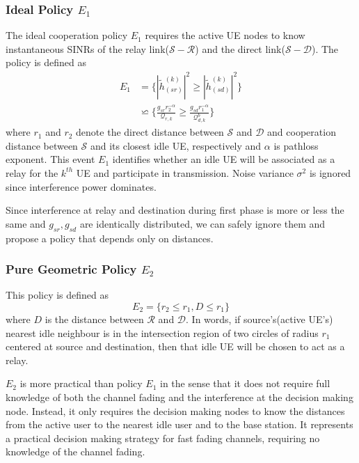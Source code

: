 \subsubsection{Ideal Policy $E_1$}
The ideal cooperation policy $E_1$ requires the active UE nodes to know instantaneous  SINRs of the relay link($\mathcal{S}-\mathcal{R}$) and the
direct link($\mathcal{S}-\mathcal{D}$). The policy is defined as 
\begin{align*}
E_1 &= \Big\{|\tilde{h}_{(sr)}^{(k)}|^2 \geq |\tilde{h}_{(sd)}^{(k)}|^2\Big\} \\
&\backsimeq \Big\{ \frac{g_{sr}r_2^{-\alpha}}{\mathcal{Q}_{r,k}} \geq \frac{g_{sd}r_1^{-\alpha}}{\mathcal{Q}_{d,k}^b} \Big\}
\end{align*}
where $r_1$ and $r_2$ denote the direct distance
between $\mathcal{S}$ and $\mathcal{D}$ and cooperation distance between $\mathcal{S}$ and its closest idle UE, respectively and $\alpha$ is pathloss exponent. This event $E_1$ identifies whether an idle UE will be associated as a relay for the $k^{th}$ UE and participate in transmission. Noise variance $\sigma^2$ is ignored since interference power dominates. 
\par Since interference at relay and destination during first phase is more or less the same and $g_{sr}, g_{sd}$ are identically distributed, we can safely ignore them and propose a policy that depends only on distances.

\subsubsection{Pure Geometric Policy $E_2$}
This policy is defined as
\begin{equation}
E_2 = \{r_2\leq r_1, D \leq r_1 \}
\end{equation}
where $D$ is the distance between $\mathcal{R}$ and $\mathcal{D}$. In words, if source's(active UE's) nearest idle neighbour is in the intersection region of two circles of radius $r_1$ centered at source and destination, then that idle UE will be chosen to act as a relay.
\par $E_2$ is more practical than policy $E_1$ in the sense that
it does not require full knowledge of both the channel fading
and the interference at the decision making node. Instead, it
only requires the decision making nodes to know the distances
from the active user to the nearest idle user and to the base
station. It represents a practical decision making strategy for
fast fading channels, requiring no knowledge of the channel
fading. 
